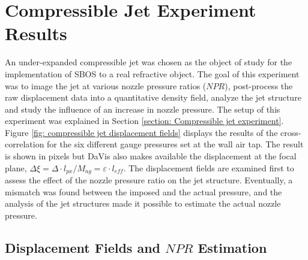\section{Compressible Jet Experiment Results}
\label{section: Compressible Jet Experiment Results}

An under-expanded compressible jet was chosen as the object of study for the implementation of SBOS to a real refractive object. The goal of this experiment was to image the jet at various nozzle pressure ratios ($NPR$), post-process the raw displacement data into a quantitative density field, analyze the jet structure and study the influence of an increase in nozzle pressure. The setup of this experiment was explained in Section \ref{section: Compressible jet experiment}. Figure \ref{fig: compressible jet displacement fields} displays the results of the cross-correlation for the six different gauge pressures set at the wall air tap. The result is shown in pixels but DaVis also makes available the displacement at the focal plane, $ \Delta \xi =\Delta \cdot l_{px}/M_{ag} = \varepsilon \cdot l_{eff}$. The displacement fields are examined first to assess the effect of the nozzle pressure ratio on the jet structure. Eventually, a mismatch was found between the imposed and the actual pressure, and the analysis of the jet structures made it possible to estimate the actual nozzle pressure.

\subsection{Displacement Fields and \texorpdfstring{$NPR$}{NPR} Estimation}
\label{subsection: Jet Displacement and NPR}

